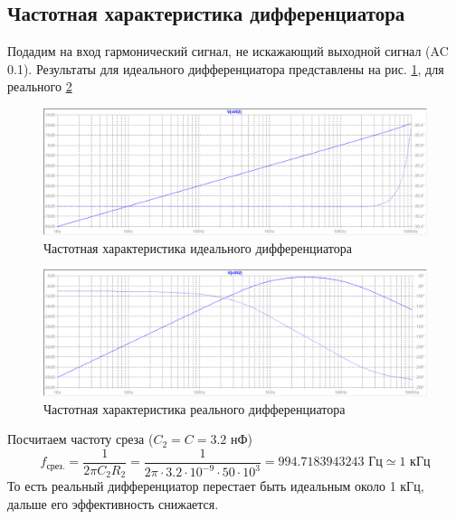\documentclass[a4paper, 12pt]{article}
\begin{document}
    \subsection{Частотная характеристика дифференциатора}
    Подадим на вход гармонический сигнал, не искажающий выходной сигнал (AC 0.1).
    Результаты для идеального дифференциатора представлены на рис. \ref{fig:4task_ideal_diff}, для
    реального \ref{fig:4task_real_diff}
    \begin{figure}[H]
        \centering
        \includegraphics[scale=0.46]{4task_ideal_diff.png}
        \captionsetup{skip=0pt}
        \caption{Частотная характеристика идеального дифференциатора}
        \label{fig:4task_ideal_diff}
    \end{figure}
    \begin{figure}[H]
        \centering
        \includegraphics[scale=0.46]{4task_real_diff.png}
        \captionsetup{skip=0pt}
        \caption{Частотная характеристика реального дифференциатора}
        \label{fig:4task_real_diff}
    \end{figure}
    \noindent Посчитаем частоту среза ($C_2=C=3.2$ нФ)
    $$
    f_{\text{срез.}}=\dfrac{1}{2\pi C_2R_2}=\dfrac{1}{2\pi\cdot3.2\cdot10^{-9}\cdot50\cdot10^3}=994.7183943243\text{ Гц}\simeq 1\text{ кГц}
    $$
    То есть реальный дифференциатор перестает быть идеальным около 1 кГц, дальше его эффективность снижается.
\end{document}
